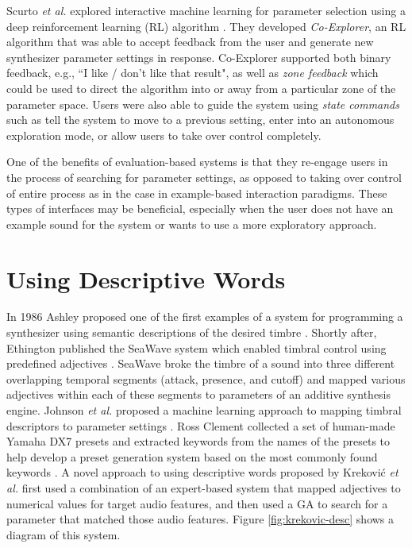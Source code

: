 Scurto \textit{et al.} \cite{scurto2021designing} explored interactive machine learning for parameter selection using a deep reinforcement learning (RL) algorithm \cite{sutton2018reinforcement}. They developed \textit{Co-Explorer}, an RL algorithm that was able to accept feedback from the user and generate new synthesizer parameter settings in response. Co-Explorer supported both binary feedback, e.g., ``I like / don't like that result", as well as \textit{zone feedback} which could be used to direct the algorithm into or away from a particular zone of the parameter space. Users were also able to guide the system using \textit{state commands} such as tell the system to move to a previous setting, enter into an autonomous exploration mode, or allow users to take over control completely.

One of the benefits of evaluation-based systems is that they re-engage users in the process of searching for parameter settings, as opposed to taking over control of entire process as in the case in example-based interaction paradigms. These types of interfaces may be beneficial, especially when the user does not have an example sound for the system or wants to use a more exploratory approach.

\section{Using Descriptive Words}\label{section:descriptive-words}
In 1986 Ashley proposed one of the first examples of a system for programming a synthesizer using semantic descriptions of the desired timbre \cite{ashley1986knowledge}. Shortly after, Ethington published the SeaWave system which enabled timbral control using predefined adjectives \cite{ethington1994seawave}. SeaWave broke the timbre of a sound into three different overlapping temporal segments (attack, presence, and cutoff) and mapped various adjectives within each of these segments to parameters of an additive synthesis engine. Johnson \textit{et al.} proposed a machine learning approach to mapping timbral descriptors to parameter settings \cite{johnson2006timbre}. Ross Clement collected a set of human-made Yamaha DX7 presets and extracted keywords from the names of the presets to help develop a preset generation system based on the most commonly found keywords \cite{clement2011automatic}. A novel approach to using descriptive words proposed by Krekovi\'{c} \textit{et al.} \cite{krekovic2016algorithm} first used a combination of an expert-based system that mapped adjectives to numerical values for target audio features, and then used a GA to search for a parameter that matched those audio features. Figure \ref{fig:krekovic-desc} shows a diagram of this system.

